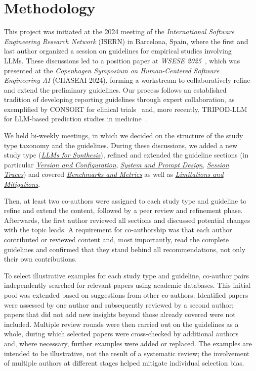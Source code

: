 \documentclass[smallextended]{svjour3}
\newcommand{\synthesis}{\hyperref[sec:llms-for-synthesis]{\emph{LLMs for Synthesis}}\xspace}
\newcommand{\synthesis}{\href{/study-types\#llms-for-synthesis}{\emph{LLMs for Synthesis}}\xspace}
\newcommand{\modelversion}{\hyperref[sec:report-model-version-configuration-and-customizations]{\emph{Version and Configuration}}\xspace}
\newcommand{\design}{\hyperref[sec:report-system-and-prompt-design]{\emph{System and Prompt Design}}\xspace}
\newcommand{\traces}{\hyperref[sec:report-session-traces]{\emph{Session Traces}}\xspace}
\newcommand{\benchmarksmetrics}{\hyperref[sec:use-suitable-baselines-benchmarks-and-metrics]{\emph{Benchmarks and Metrics}}\xspace}
\newcommand{\limitationsmitigations}{\hyperref[sec:report-limitations-and-mitigations]{\emph{Limitations and Mitigations}}\xspace}
\newcommand{\modelversion}{\href{/guidelines\#report-model-version-configuration-and-customizations}{\emph{Version and Configuration}}\xspace}
\newcommand{\design}{\href{/guidelines\#report-system-and-prompt-design}{\emph{System and Prompt Design}}\xspace}
\newcommand{\traces}{\href{/guidelines\#report-session-traces}{\emph{Session Traces}}\xspace}
\newcommand{\benchmarksmetrics}{\href{/guidelines\#use-suitable-baselines-benchmarks-and-metrics}{\emph{Benchmarks and Metrics}}\xspace}
\newcommand{\limitationsmitigations}{\href{/guidelines\#report-limitations-and-mitigations}{\emph{Limitations and Mitigations}}\xspace}
\begin{document}
\section{Methodology}
\label{sec:methodology}

This project was initiated at the 2024 meeting of the \emph{International Software Engineering Research Network} (ISERN) in Barcelona, Spain, where the first and last author organized a session on guidelines for empirical studies involving LLMs.
These discussions led to a position paper at \emph{WSESE 2025}~\citep{DBLP:conf/wsese/0001BFB25}, which was presented at the \emph{ Copenhagen Symposium on Human-Centered Software Engineering AI} (CHASEAI 2024), forming a workstream to collaboratively refine and extend the preliminary guidelines.
Our process follows an established tradition of developing reporting guidelines through expert collaboration, as exemplified by CONSORT for clinical trials~\citep{Begg1996} and, more recently, TRIPOD-LLM for LLM-based prediction studies in medicine~\citep{Gallifant2025}.

We held bi-weekly meetings, in which we decided on the structure of the study type taxonomy and the guidelines.
During these discussions, we added a new study type (\synthesis), refined and extended the guideline sections (in particular \modelversion, \design, \traces) and covered \benchmarksmetrics as well as \limitationsmitigations.

Then, at least two co-authors were assigned to each study type and guideline to refine and extend the content, followed by a peer review and refinement phase.
Afterwards, the first author reviewed all sections and discussed potential changes with the topic leads.
A requirement for co-authorship was that each author contributed or reviewed content and, most importantly, read the complete guidelines and confirmed that they stand behind all recommendations, not only their own contributions.

To select illustrative examples for each study type and guideline, co-author pairs independently searched for relevant papers using academic databases.
This initial pool was extended based on suggestions from other co-authors.
Identified papers were assessed by one author and subsequently reviewed by a second author; papers that did not add new insights beyond those already covered were not included.
Multiple review rounds were then carried out on the guidelines as a whole, during which selected papers were cross-checked by additional authors and, where necessary, further examples were added or replaced.
The examples are intended to be illustrative, not the result of a systematic review; the involvement of multiple authors at different stages helped mitigate individual selection bias.
\end{document}
